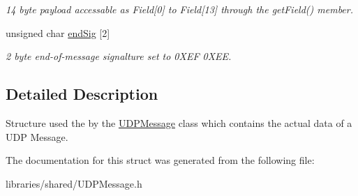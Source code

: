 \begin{DoxyCompactItemize}
\begin{DoxyCompactList}\small\item\em 14 byte payload accessable as Field\mbox{[}0\mbox{]} to Field\mbox{[}13\mbox{]} through the get\+Field() member. \end{DoxyCompactList}\item 
\mbox{\label{struct_u_d_p_message_struct_a68c8ce1a9f79ecb4b3955eaf98a4781c}} 
unsigned char \hyperlink{struct_u_d_p_message_struct_a68c8ce1a9f79ecb4b3955eaf98a4781c}{end\+Sig} \mbox{[}2\mbox{]}
\begin{DoxyCompactList}\small\item\em 2 byte end-\/of-\/message signalture set to 0\+X\+EF 0\+X\+EE. \end{DoxyCompactList}\end{DoxyCompactItemize}


\subsection{Detailed Description}
Structure used the by the \hyperlink{class_u_d_p_message}{U\+D\+P\+Message} class which contains the actual data of a U\+DP Message. 

The documentation for this struct was generated from the following file\+:\begin{DoxyCompactItemize}
\item 
libraries/shared/U\+D\+P\+Message.\+h\end{DoxyCompactItemize}
